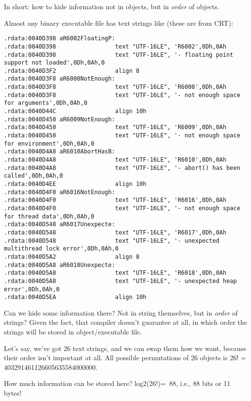 
In short: how to hide information not in objects, but in \textit{order} of objects.

Almost any binary executable file has text strings like (these are from CRT):

\begin{lstlisting}
.rdata:0040D398 aR6002FloatingP:
.rdata:0040D398                 text "UTF-16LE", 'R6002',0Dh,0Ah
.rdata:0040D398                 text "UTF-16LE", '- floating point support not loaded',0Dh,0Ah,0
.rdata:0040D3F2                 align 8
.rdata:0040D3F8 aR6008NotEnough:
.rdata:0040D3F8                 text "UTF-16LE", 'R6008',0Dh,0Ah
.rdata:0040D3F8                 text "UTF-16LE", '- not enough space for arguments',0Dh,0Ah,0
.rdata:0040D44C                 align 10h
.rdata:0040D450 aR6009NotEnough:
.rdata:0040D450                 text "UTF-16LE", 'R6009',0Dh,0Ah
.rdata:0040D450                 text "UTF-16LE", '- not enough space for environment',0Dh,0Ah,0
.rdata:0040D4A8 aR6010AbortHasB:
.rdata:0040D4A8                 text "UTF-16LE", 'R6010',0Dh,0Ah
.rdata:0040D4A8                 text "UTF-16LE", '- abort() has been called',0Dh,0Ah,0
.rdata:0040D4EE                 align 10h
.rdata:0040D4F0 aR6016NotEnough:
.rdata:0040D4F0                 text "UTF-16LE", 'R6016',0Dh,0Ah
.rdata:0040D4F0                 text "UTF-16LE", '- not enough space for thread data',0Dh,0Ah,0
.rdata:0040D548 aR6017Unexpecte:
.rdata:0040D548                 text "UTF-16LE", 'R6017',0Dh,0Ah
.rdata:0040D548                 text "UTF-16LE", '- unexpected multithread lock error',0Dh,0Ah,0
.rdata:0040D5A2                 align 8
.rdata:0040D5A8 aR6018Unexpecte:
.rdata:0040D5A8                 text "UTF-16LE", 'R6018',0Dh,0Ah
.rdata:0040D5A8                 text "UTF-16LE", '- unexpected heap error',0Dh,0Ah,0
.rdata:0040D5EA                 align 10h
\end{lstlisting}

Can we hide some information there?
Not in string themselves, but in \textit{order} of strings?
Given the fact, that compiler doesn't guarantee at all,
in which order the strings will be stored in object/executable file.

Let's say, we've got 26 text strings, and we can swap them how we want, because their order isn't important at all.
All possible permutations of 26 objects is 
26! = 403291461126605635584000000.

How much information can be stored here?
log2(26!)=~88, i.e., 88 bits or 11 bytes!

